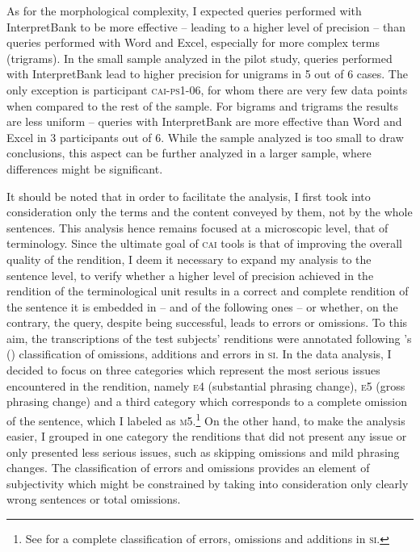 \documentclass[output=paper]{langsci/langscibook}
\begin{document}
As for the morphological complexity, I expected queries performed with InterpretBank to be more effective – leading to a higher level of precision – than queries performed with Word and Excel, especially for more complex terms (trigrams). In the small sample analyzed in the pilot study, queries performed with InterpretBank lead to higher precision for unigrams in 5 out of 6 cases. The only exception is participant \textsc{cai}-\textsc{ps1-06}, for whom there are very few data points when compared to the rest of the sample. For bigrams and trigrams the results are less uniform -- queries with InterpretBank are more effective than Word and Excel in 3 participants out of 6. While the sample analyzed is too small to draw conclusions, this aspect can be further analyzed in a larger sample, where differences might be significant.

It should be noted that in order to facilitate the analysis, I first took into consideration only the terms and the content conveyed by them, not by the whole sentences. This analysis hence remains focused at a microscopic level, that of terminology. Since the ultimate goal of \textsc{cai} tools is that of improving the overall quality of the rendition, I deem it necessary to expand my analysis to the sentence level, to verify whether a higher level of precision achieved in the rendition of the terminological unit results in a correct and complete rendition of the sentence it is embedded in – and of the following ones – or whether, on the contrary, the query, despite being successful, leads to errors or omissions. To this aim, the transcriptions of the test subjects’ renditions were annotated following \citeauthor{Barik1971}’s (\citeyear{Barik1971}) classification of omissions, additions and errors in \textsc{si}. In the data analysis, I decided to focus on three categories which represent the most serious issues encountered in the rendition, namely \textsc{e4} (substantial phrasing change), \textsc{e5} (gross phrasing change) and a third category which corresponds to a complete omission of the sentence, which I labeled as \textsc{m5}.\footnote{See \citet{Barik1971} for a complete classification of errors, omissions and additions in \textsc{si}.} On the other hand, to make the analysis easier, I grouped in one category the renditions that did not present any issue or only presented less serious issues, such as skipping omissions and mild phrasing changes. The classification of errors and omissions provides an element of subjectivity which might be constrained by taking into consideration only clearly wrong sentences or total omissions.
\end{document}
